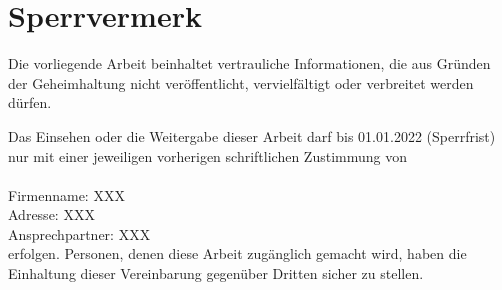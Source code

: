 \newpage
\thispagestyle{empty}
\section*{Sperrvermerk}

Die vorliegende Arbeit beinhaltet vertrauliche Informationen, die aus Gründen der Geheimhaltung
nicht veröffentlicht, vervielfältigt oder verbreitet werden dürfen.

Das Einsehen oder die Weitergabe dieser Arbeit darf bis 01.01.2022 (Sperrfrist) nur mit einer jeweiligen vorherigen schriftlichen Zustimmung von 
\\\\
\noindent
Firmenname: XXX \\
Adresse: XXX\\
Ansprechpartner: XXX\\

\noindent
erfolgen.
Personen, denen diese Arbeit zugänglich gemacht wird, haben die Einhaltung dieser Vereinbarung gegenüber Dritten sicher zu stellen.

